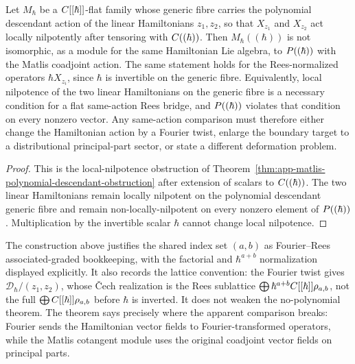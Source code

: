 \begin{cor}
\label{cor:app-matlis-no-flat-same-action-interpolation}
  Let \(M_\hbar\) be a \(C[[\hbar]]\)-flat family whose generic fibre
  carries the polynomial descendant action of the linear Hamiltonians
  \(z_1,z_2\), so that \(X_{z_1}\) and \(X_{z_2}\) act locally
  nilpotently after tensoring with \(C((\hbar))\).  Then
  \(M_\hbar((\hbar))\) is not isomorphic, as a module for the same
  Hamiltonian Lie algebra, to \(P((\hbar))\) with the Matlis
  coadjoint action.  The same statement holds for the Rees-normalized
  operators \(\hbar X_{z_i}\), since \(\hbar\) is invertible on the
  generic fibre.  Equivalently, local nilpotence of the two linear
  Hamiltonians on the generic fibre is a necessary condition for a flat
  same-action Rees bridge, and \(P((\hbar))\) violates that condition
  on every nonzero vector.  Any same-action comparison must therefore
  either change the Hamiltonian action by a Fourier twist, enlarge the
  boundary target to a distributional principal-part sector, or state a
  different deformation problem.
\end{cor}

\begin{proof}
  This is the local-nilpotence obstruction of
  Theorem~\ref{thm:app-matlis-polynomial-descendant-obstruction} after extension
  of scalars to \(C((\hbar))\).  The two linear Hamiltonians remain
  locally nilpotent on the polynomial descendant generic fibre and
  remain non-locally-nilpotent on every nonzero element of
  \(P((\hbar))\).  Multiplication by the invertible scalar
  \(\hbar\) cannot change local nilpotence.
\end{proof}

\begin{rmk}
\label{rmk:app-matlis-rees-bridge-status}
  The construction above justifies the shared index set
  \((a,b)\) as Fourier--Rees associated-graded bookkeeping, with the factorial and
  \(\hbar^{a+b}\) normalization displayed explicitly.  It also records
  the lattice convention: the Fourier twist gives
  \(\mathcal D_\hbar/(z_1,z_2)\), whose \v{C}ech realization is the Rees
  sublattice \(\bigoplus\hbar^{a+b}C[[\hbar]]\rho_{a,b}\), not the full
  \(\bigoplus C[[\hbar]]\rho_{a,b}\) before \(\hbar\) is inverted.  It
  does not weaken the no-polynomial theorem.  The theorem says
  precisely where the apparent comparison breaks: Fourier sends the
  Hamiltonian vector fields to Fourier-transformed operators, while the
  Matlis cotangent module uses the original coadjoint vector fields on
  principal parts.
\end{rmk}
